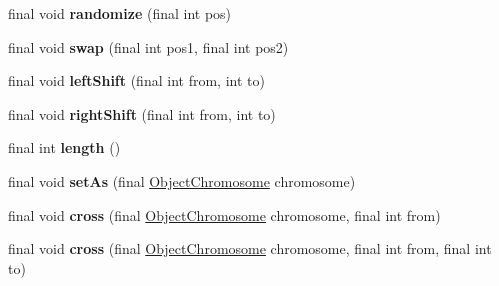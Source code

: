 \begin{CompactItemize}
\item 
\hypertarget{classjenes_1_1chromosome_1_1_object_chromosome_ac077d08ae00b9805797d5848a10c1f4}{
final void \textbf{randomize} (final int pos)}
\label{classjenes_1_1chromosome_1_1_object_chromosome_ac077d08ae00b9805797d5848a10c1f4}

\item 
\hypertarget{classjenes_1_1chromosome_1_1_object_chromosome_f85db410fecd769993c248f94396dd53}{
final void \textbf{swap} (final int pos1, final int pos2)}
\label{classjenes_1_1chromosome_1_1_object_chromosome_f85db410fecd769993c248f94396dd53}

\item 
\hypertarget{classjenes_1_1chromosome_1_1_object_chromosome_1e1570b75182f3d244a6d857a6acb7bf}{
final void \textbf{leftShift} (final int from, int to)}
\label{classjenes_1_1chromosome_1_1_object_chromosome_1e1570b75182f3d244a6d857a6acb7bf}

\item 
\hypertarget{classjenes_1_1chromosome_1_1_object_chromosome_584d10eceb2858e0ef88ea7f7c21d83c}{
final void \textbf{rightShift} (final int from, int to)}
\label{classjenes_1_1chromosome_1_1_object_chromosome_584d10eceb2858e0ef88ea7f7c21d83c}

\item 
\hypertarget{classjenes_1_1chromosome_1_1_object_chromosome_12ff61d91455ed5915bcf71c889ea1dd}{
final int \textbf{length} ()}
\label{classjenes_1_1chromosome_1_1_object_chromosome_12ff61d91455ed5915bcf71c889ea1dd}

\item 
\hypertarget{classjenes_1_1chromosome_1_1_object_chromosome_77fd7d633e3663ea8fb63db2857bb1b7}{
final void \textbf{setAs} (final \hyperlink{classjenes_1_1chromosome_1_1_object_chromosome}{ObjectChromosome} chromosome)}
\label{classjenes_1_1chromosome_1_1_object_chromosome_77fd7d633e3663ea8fb63db2857bb1b7}

\item 
\hypertarget{classjenes_1_1chromosome_1_1_object_chromosome_8f0770f15071e71ee86d7ad43541118f}{
final void \textbf{cross} (final \hyperlink{classjenes_1_1chromosome_1_1_object_chromosome}{ObjectChromosome} chromosome, final int from)}
\label{classjenes_1_1chromosome_1_1_object_chromosome_8f0770f15071e71ee86d7ad43541118f}

\item 
\hypertarget{classjenes_1_1chromosome_1_1_object_chromosome_25225ffc89dae70e0b0ddeb21f8f125d}{
final void \textbf{cross} (final \hyperlink{classjenes_1_1chromosome_1_1_object_chromosome}{ObjectChromosome} chromosome, final int from, final int to)}
\label{classjenes_1_1chromosome_1_1_object_chromosome_25225ffc89dae70e0b0ddeb21f8f125d}


\end{CompactItemize}
